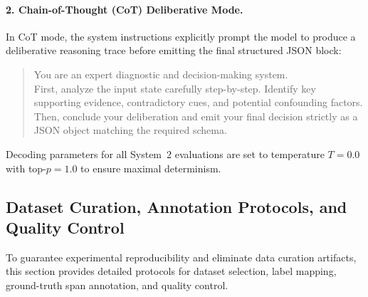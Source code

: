 \documentclass[10pt]{article}
\begin{document}
\paragraph{2. Chain-of-Thought (CoT) Deliberative Mode.}
In CoT mode, the system instructions explicitly prompt the model to produce a deliberative reasoning trace before emitting the final structured JSON block:
\begin{quote}
\small\ttfamily
You are an expert diagnostic and decision-making system.\\
First, analyze the input state carefully step-by-step. Identify key supporting evidence, contradictory cues, and potential confounding factors.\\
Then, conclude your deliberation and emit your final decision strictly as a JSON object matching the required schema.
\end{quote}
Decoding parameters for all System~2 evaluations are set to temperature $T = 0.0$ with top-$p = 1.0$ to ensure maximal determinism.

\subsection{Dataset Curation, Annotation Protocols, and Quality Control}
\label{sec:curation}

To guarantee experimental reproducibility and eliminate data curation artifacts, this section provides detailed protocols for dataset selection, label mapping, ground-truth span annotation, and quality control.
\end{document}
